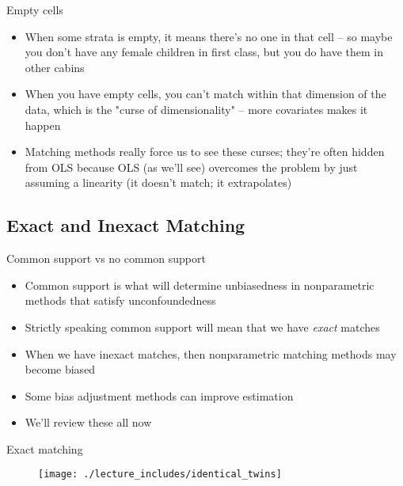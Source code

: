 \documentclass{beamer}
\begin{document}
\begin{frame}{Empty cells}
	
	\begin{itemize}
	\item When some strata is empty, it means there's no one in that cell -- so maybe you don't have any female children in first class, but you do have them in other cabins
	\item When you have empty cells, you can't match within that dimension of the data, which is the "curse of dimensionality" -- more covariates makes it happen
	\item Matching methods really force us to see these curses; they're often hidden from OLS because OLS (as we'll see) overcomes the problem by just assuming a linearity (it doesn't match; it extrapolates)
	\end{itemize}
\end{frame}	







\subsection{Exact and Inexact Matching}


\begin{frame}{Common support vs no common support}

\begin{itemize}
\item Common support is what will determine unbiasedness in nonparametric methods that satisfy unconfoundedness
\item Strictly speaking common support will mean that we have \emph{exact} matches
\item When we have inexact matches, then nonparametric matching methods may become biased
\item Some bias adjustment methods can improve estimation
\item We'll review these all now
\end{itemize}

\end{frame}



\begin{frame}{Exact matching}

\begin{figure}[!t]\centering
\texttt{[image: ./lecture\_includes/identical\_twins]}
\end{figure}

\end{frame}
\end{document}

